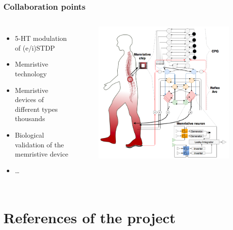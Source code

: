 \documentclass[12pt, aspectratio=169]{beamer}
\begin{document}
\begin{frame}
  \frametitle{Collaboration points}
\begin{columns}[c]

\begin{itemize}
\item 5-HT modulation of (e/i)STDP
\item Memristive technology
\item Memristive devices of different types thousands
\item Biological validation of the memristive device
\item \ldots
\end{itemize}

\begin{figure}
\includegraphics[width=1.0\linewidth]{MemArc_logo}
\end{figure}
\end{columns}
\end{frame}

\section{References of the project}
\end{document}
